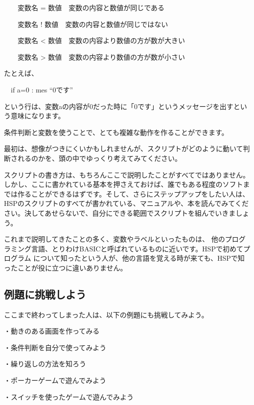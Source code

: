 \documentclass[a4paper,12pt]{jarticle}
\begin{document}
\ \ \ \ 変数名 =
数値\ \ 変数の内容と数値が同じである

\ \ \ \ 変数名 !
数値\ \ 変数の内容と数値が同じではない

\ \ \ \ 変数名 {\textless}
数値\ \ 変数の内容より数値の方が数が大きい

\ \ \ \ 変数名 {\textgreater}
数値\ \ 変数の内容より数値の方が数が小さい

\bigskip

たとえば、

\bigskip

\ \ if a=0 : mes “0です”

\bigskip

という行は、変数aの内容が0だった時に「0です」というメッセージを出すという意味になります。

条件判断と変数を使うことで、とても複雑な動作を作ることができます。

最初は、想像がつきにくいかもしれませんが、スクリプトがどのように動いて判断されるのかを、頭の中でゆっくり考えてみてください。

スクリプトの書き方は、もちろんここで説明したことがすべてではありません。しかし、ここに書かれている基本を押さえておけば、誰でもある程度のソフトまでは作ることができるはずです。そして、さらにステップアップをしたい人は、HSPのスクリプトのすべてが書かれている、マニュアルや、本を読んでみてください。決してあせらないで、自分にできる範囲でスクリプトを組んでいきましょう。

これまで説明してきたことの多く、変数やラベルといったものは、
他のプログラミング言語、とりわけBASICと呼ばれているものに近いです。HSPで初めてプログラム
について知ったという人が、他の言語を覚える時が来ても、HSPで知ったことが役に立つに違いありません。

\bigskip
\bigskip

\subsection{例題に挑戦しよう}

\bigskip
\bigskip

ここまで終わってしまった人は、以下の例題にも挑戦してみよう。

\bigskip

・動きのある画面を作ってみる

・条件判断を自分で使ってみよう

・繰り返しの方法を知ろう

・ポーカーゲームで遊んでみよう

・スイッチを使ったゲームで遊んでみよう
\end{document}
